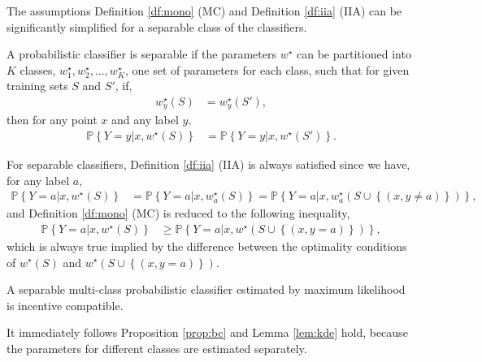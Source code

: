 \documentclass{article}
\begin{document}
The assumptions Definition \ref{df:mono} (MC) and Definition \ref{df:iia} (IIA) can be significantly simplified for a separable class of the classifiers.
\newline \newline
\begin{df} \label{df:sep} 
A probabilistic classifier is separable if the parameters $w^\star $ can be partitioned into $K $ classes, $w^\star _{1}, w^\star _{2}, ..., w^\star _{K}$, one set of parameters for each class, such that for given training sets $S $ and $S'$, if,
\begin{align*}
w^\star _{y}\left(S\right) &= w^\star _{y}\left(S'\right),
\end{align*}
then for any point $x $ and any label $y, $
\begin{align*}
\mathbb{P}\left\{Y = y | x, w^\star \left(S\right)\right\} &= \mathbb{P}\left\{Y = y | x, w^\star \left(S'\right)\right\}.
\end{align*}\end{df}
For separable classifiers, Definition \ref{df:iia} (IIA) is always satisfied since we have, for any label $a, $
\begin{align*}
\mathbb{P}\left\{Y = a|x, w^\star \left(S\right)\right\} &= \mathbb{P}\left\{Y = a|x, w^\star _{a}\left(S\right)\right\} = \mathbb{P}\left\{Y = a|x, w^\star _{a}\left(S \cup \left\{\left(x, y \neq  a\right)\right\}\right)\right\},
\end{align*}
and Definition \ref{df:mono} (MC) is reduced to the following inequality,
\begin{align*}
\mathbb{P}\left\{Y = a | x, w^\star \left(S\right)\right\} &\geq  \mathbb{P}\left\{Y = a | x, w^\star \left(S \cup \left\{\left(x, y = a\right)\right\}\right)\right\},
\end{align*}
which is always true implied by the difference between the optimality conditions of $w^\star \left(S\right)$ and $w^\star \left(S \cup \left\{\left(x, y = a\right)\right\}\right)$.
\newline \newline
\begin{cor} \label{cor:sepmargin} 
A separable multi-class probabilistic classifier estimated by maximum likelihood is incentive compatible.
\newline \newline\end{cor}
It immediately follows Proposition \ref{prop:bc} and Lemma \ref{lem:kde} hold, because the parameters for different classes are estimated separately.
\end{document}
